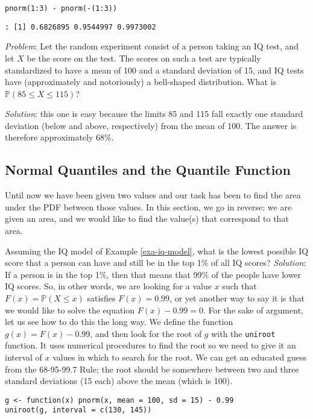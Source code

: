 \begin{Verbatim}
pnorm(1:3) - pnorm(-(1:3))
\end{Verbatim}

\begin{verbatim}
: [1] 0.6826895 0.9544997 0.9973002
\end{verbatim}

\emph{Problem}:
\label{exa-iq-model} Let the random experiment consist of a person taking
an IQ test, and let \(X\) be the score on the test. The scores on such
a test are typically standardized to have a mean of 100 and a standard
deviation of 15, and IQ tests have (approximately and notoriously) a
bell-shaped distribution. What is \(\mathbb{P}(85\leq X\leq115)\)?

\emph{Solution}: this one is easy because the limits 85 and 115 fall
exactly one standard deviation (below and above, respectively) from
the mean of 100. The answer is therefore approximately 68\%.

\subsection{Normal Quantiles and the Quantile Function}
\label{sec-6-3-1}

Until now we have been given two values and our task has been to find
the area under the PDF between those values. In this section, we go in
reverse: we are given an area, and we would like to find the value(s)
that correspond to that area.

\label{exa-iq-quantile-state-problem} Assuming the IQ model of Example
\ref{exa-iq-model}, what is the lowest possible IQ score that a person can
have and still be in the top 1\% of all IQ scores?  \emph{Solution}: If a
person is in the top 1\%, then that means that 99\% of the people have
lower IQ scores. So, in other words, we are looking for a value \(x\)
such that \(F(x)=\mathbb{P}(X\leq x)\) satisfies \(F(x)=0.99\), or yet
another way to say it is that we would like to solve the equation
\(F(x)-0.99=0\). For the sake of argument, let us see how to do this
the long way. We define the function \(g(x)=F(x)-0.99\), and then look
for the root of \(g\) with the \texttt{uniroot} function. It uses numerical
procedures to find the root so we need to give it an interval of \(x\)
values in which to search for the root. We can get an educated guess
from the 68-95-99.7 Rule;
the root should be
somewhere between two and three standard deviations (15 each) above
the mean (which is 100).
\begin{Verbatim}
g <- function(x) pnorm(x, mean = 100, sd = 15) - 0.99
uniroot(g, interval = c(130, 145))
\end{Verbatim}

